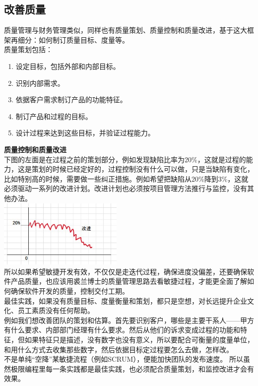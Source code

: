
\hypertarget{ux6539ux5584ux8d28ux91cf}{%
\subsection{改善质量}\label{ux6539ux5584ux8d28ux91cf}}

质量管理与财务管理类似，同样也有质量策划、质量控制和质量改进，基于这大框架再细分：如何制订质量目标、度量等。\\
质量策划包括：

\begin{enumerate}
\tightlist
\item
  设定目标，包括外部和内部目标。
\item
  识别内部需求。
\item
  依据客户需求制订产品的功能特征。
\item
  制订产品和过程的目标。
\item
  设计过程来达到这些目标，并验证过程能力。\\
\end{enumerate}

\textbf{质量控制和质量改进}\\
下图的左面是在过程之前的策划部分，例如发现缺陷比率为20\%，这就是过程的能力，这是策划的时候已经定好的，过程控制没有什么可以做，只是当缺陷有变化，比如特别高的时候，需要做一些纠正措施。例如希望把缺陷从20\%降到3\%，这就必须驱动一系列的改进计划。改进计划也必须按项目管理方法推行与监控，没有其他办法。\\

\includegraphics[width=6cm]{JuranImprovementScreenshot_2022-10-23_211444-1.jpg}\\

所以如果希望敏捷开发有效，不仅仅是走迭代过程，确保进度没偏差，还要确保软件产品质量，也应该用裘兰博士的质量管理思路去看敏捷过程，才能更全面了解如何确保软件开发的质量，控制交付工期。\\
最佳实践，如果没有质量目标、度量衡量和策划，都只是空想，对长远提升企业文化、员工素质没有任何帮助。\\
例如我们想改善团队的策划和估算。首先要识别客户，哪些是主要干系人——甲方有什么要求、内部部门经理有什么要求。然后从他们的诉求变成过程的功能和特征，但如果特征只是描述，没有数字也没有意义，所以要配合可衡量的度量单位，和用什么方式去收集那些数字，然后依据目标定过程要怎么去做，怎样改。\\
不是单纯``空降''某敏捷流程（例如SCRUM），便能加快团队的发布速度。
所以虽然极限编程里每一条实践都是最佳实践，也必须配合质量策划，和监控改进才会有效果。

